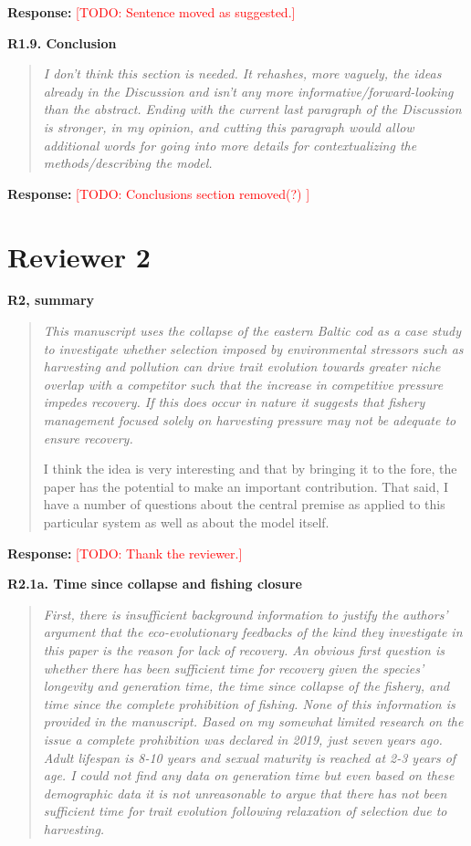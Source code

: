 \documentclass[11pt]{article}
\newenvironment{revcomment}[1]
  {\par\medskip\noindent\textbf{#1}\par\begin{quote}\itshape\color{commentgrey}}
  {\end{quote}}
\newcommand{\response}{\par\noindent\textbf{Response:} }
\newcommand{\todo}[1]{\textcolor{red}{[TODO: #1]}}
\begin{document}
\response \todo{Sentence moved as suggested.}

\begin{revcomment}{R1.9. Conclusion}
I don't think this section is needed. It rehashes, more vaguely, the ideas already in the Discussion and isn't any more informative/forward-looking than the abstract. Ending with the current last paragraph of the Discussion is stronger, in my opinion, and cutting this paragraph would allow additional words for going into more details for contextualizing the methods/describing the model.
\end{revcomment}

\response \todo{Conclusions section removed(?)
}

\section*{Reviewer 2}

\begin{revcomment}{R2, summary}
This manuscript uses the collapse of the eastern Baltic cod as a case study to investigate whether selection imposed by environmental stressors such as harvesting and pollution can drive trait evolution towards greater niche overlap with a competitor such that the increase in competitive pressure impedes recovery. If this does occur in nature it suggests that fishery management focused solely on harvesting pressure may not be adequate to ensure recovery.

I think the idea is very interesting and that by bringing it to the fore, the paper has the potential to make an important contribution. That said, I have a number of questions about the central premise as applied to this particular system as well as about the model itself.
\end{revcomment}

\response \todo{Thank the reviewer.}

\begin{revcomment}{R2.1a. Time since collapse and fishing closure}
First, there is insufficient background information to justify the authors' argument that the eco-evolutionary feedbacks of the kind they investigate in this paper is the reason for lack of recovery. An obvious first question is whether there has been sufficient time for recovery given the species' longevity and generation time, the time since collapse of the fishery, and time since the complete prohibition of fishing. None of this information is provided in the manuscript. Based on my somewhat limited research on the issue a complete prohibition was declared in 2019, just seven years ago. Adult lifespan is 8-10 years and sexual maturity is reached at 2-3 years of age. I could not find any data on generation time but even based on these demographic data it is not unreasonable to argue that there has not been sufficient time for trait evolution following relaxation of selection due to harvesting.
\end{revcomment}
\end{document}
